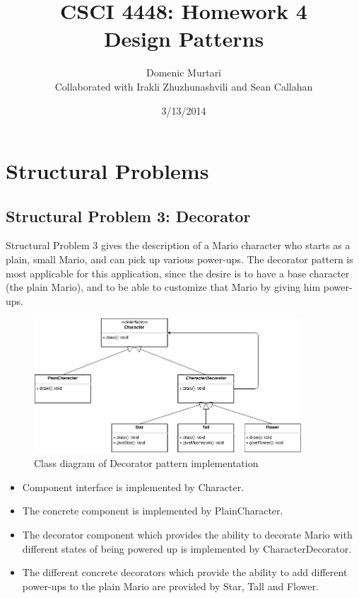 \documentclass[12pt]{article}
\title{CSCI 4448: Homework 4 \\ Design Patterns}
\author{
  Domenic Murtari \\
  Collaborated with Irakli Zhuzhunashvili and Sean Callahan
}
\date{3/13/2014}
\begin{document}
\maketitle

\section{Structural Problems}
\subsection{Structural Problem 3: Decorator}

Structural Problem 3 gives the description of a Mario character who starts as
a plain, small Mario, and can pick up various power-ups. The decorator pattern 
is most applicable for this application, since the desire is to have a base 
character (the plain Mario), and to be able to customize that Mario by giving
him power-ups.

\begin{figure}[!htb]
  \begin{center}
    \includegraphics[width=100mm]{Decorator.png}
    \caption{Class diagram of Decorator pattern implementation}
    \label{fig:decorator}
  \end{center} 
\end{figure}

\begin{itemize}
\item Component interface is implemented by {\ttfamily Character}.
\item The concrete component is implemented by {\ttfamily PlainCharacter}.
\item The decorator component which provides the ability to decorate Mario with
  different states of being powered up is implemented by 
  {\ttfamily CharacterDecorator}.
\item The different concrete decorators which provide the ability to add 
  different power-ups to the plain Mario are provided by {\ttfamily Star, Tall} 
  and {\ttfamily Flower}.
\end{itemize}
\end{document}
